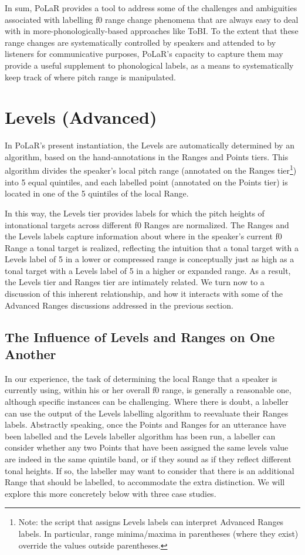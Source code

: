 In sum, PoLaR provides a tool to address some of the challenges and ambiguities associated with labelling f0 range change phenomena that are always easy to deal with in more-phonologically-based approaches like ToBI.  To the extent that these range changes are systematically controlled by speakers and attended to by listeners for communicative purposes, PoLaR’s capacity to capture them may provide a useful supplement to phonological labels, as a means to systematically keep track of where pitch range is manipulated.

\section{Levels (Advanced)}\label{sec:levels-advanced}
In PoLaR’s present instantiation, the Levels are automatically determined by an algorithm, based on the hand-annotations in the Ranges and Points tiers.  This algorithm divides the speaker’s local pitch range (annotated on the Ranges tier\footnote{Note: the script that assigns Levels labels can interpret Advanced Ranges labels. In particular, range minima\slash maxima in parentheses (where they exist) override the values outside parentheses.}) into 5 equal quintiles, and each labelled point (annotated on the Points tier) is located in one of the 5 quintiles of the local Range.

In this way, the Levels tier provides labels for which the pitch heights of intonational targets across different f0 Ranges are normalized.  The Ranges and the Levels labels capture information about where in the speaker’s current f0 Range a tonal target is realized, reflecting the intuition that a tonal target with a Levels label of 5 in a lower or compressed range is conceptually just as high as a tonal target with a Levels label of 5 in a higher or expanded range. As a result, the Levels tier and Ranges tier are intimately related. We turn now to a discussion of this inherent relationship, and how it interacts with some of the Advanced Ranges discussions addressed in the previous section.

\subsection{The Influence of Levels and Ranges on One Another}\label{sec:the-influence-of-levels-and-ranges-on-one-another}

In our experience, the task of determining the local Range that a speaker is currently using, within his or her overall f0 range, is generally a reasonable one, although specific instances can be challenging. Where there is doubt, a labeller can use the output of the Levels labelling algorithm to reevaluate their Ranges labels. Abstractly speaking, once the Points and Ranges for an utterance have been labelled and the Levels labeller algorithm has been run, a labeller can consider whether any two Points that have been assigned the same levels value are indeed in the same quintile band, or if they sound as if they reflect different tonal heights.  If so, the labeller may want to consider that there is an additional Range that should be labelled, to accommodate the extra distinction. We will explore this more concretely below with three case studies.

